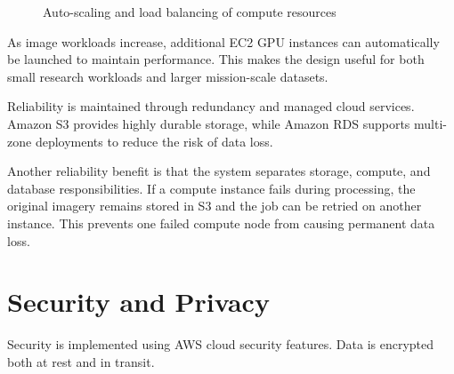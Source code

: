 \documentclass[conference]{IEEEtran}
\begin{document}
	\begin{figure}[ht]
		\centering
		
		\vspace{-2mm}
		\caption{Auto-scaling and load balancing of compute resources}
		\vspace{-4mm}
	\end{figure}
	
	As image workloads increase, additional EC2 GPU instances can automatically be launched to maintain performance. This makes the design useful for both small research workloads and larger mission-scale datasets.
	
	Reliability is maintained through redundancy and managed cloud services. Amazon S3 provides highly durable storage, while Amazon RDS supports multi-zone deployments to reduce the risk of data loss.
	
	Another reliability benefit is that the system separates storage, compute, and database responsibilities. If a compute instance fails during processing, the original imagery remains stored in S3 and the job can be retried on another instance. This prevents one failed compute node from causing permanent data loss.
	
	\section{Security and Privacy}
	
	Security is implemented using AWS cloud security features. Data is encrypted both at rest and in transit.
	
\end{document}
